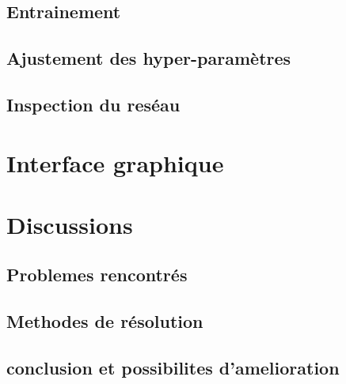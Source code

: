 \documentclass[11pt]{article}
\begin{document}
\subsection{Entrainement}

\subsection{Ajustement des hyper-param\`etres}

\subsection{Inspection du res\'eau}

\section{Interface graphique}



\section{Discussions}
\subsection{Problemes rencontr\'es}
\subsection{Methodes de r\'esolution}
\subsection{conclusion et possibilites d'amelioration}
\end{document}
